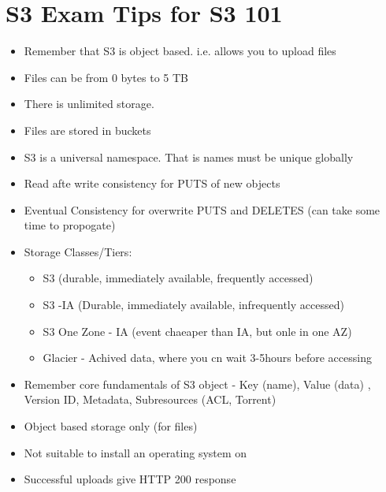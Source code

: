 \documentclass{report}
\begin{document}
\section*{S3 Exam Tips for S3 101}
\begin{itemize}
\item
Remember that S3 is object based. i.e. allows you to upload files

\item
Files can be from 0 bytes to 5 TB

\item
There is unlimited storage.

\item
Files are stored in buckets

\item
S3 is a universal namespace. That is names must be unique globally

\item
Read afte write consistency for PUTS of new objects

\item
Eventual Consistency for overwrite PUTS and DELETES (can take some time to propogate)

\item
Storage Classes/Tiers:
	\begin{itemize}
	\item
	S3 (durable, immediately available, frequently accessed)
	
	\item
	S3 -IA (Durable, immediately available, infrequently accessed)
	
	\item
	S3 One Zone - IA (event chaeaper than IA, but onle in one AZ)
	
	\item
	Glacier - Achived data, where you cn wait 3-5hours before accessing
	\end{itemize}

\item
Remember core fundamentals of S3 object - Key (name), Value (data) , Version ID, Metadata, Subresources (ACL, Torrent)

\item
Object based storage only (for files)

\item
Not suitable to install an operating system on

\item
Successful uploads give HTTP 200 response

\end{itemize}
\end{document}
